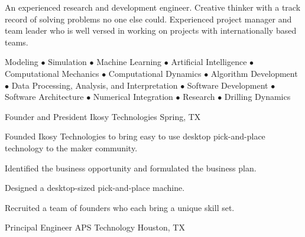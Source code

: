 \documentclass{leresume}
\begin{document}
		\thispagestyle{leempty}
		\makeresumeheaderC

		An experienced research and development engineer. Creative thinker with a track record of solving problems no one else could. Experienced project manager and team leader who is well versed in working on projects with internationally based teams.

	Modeling $\bullet$ Simulation $\bullet$ Machine Learning $\bullet$ Artificial Intelligence $\bullet$ Computational Mechanics $\bullet$ Computational Dynamics $\bullet$ Algorithm Development $\bullet$ Data Processing, Analysis, and Interpretation $\bullet$ Software Development $\bullet$ Software Architecture $\bullet$ Numerical Integration $\bullet$ Research $\bullet$ Drilling Dynamics

    
            {Founder and President}
            {Ikosy Technologies}
			{Spring, TX}
			
					\noindent Founded Ikosy Technologies to bring easy to use desktop pick-and-place technology to the maker community.
		\begin{bulletedlist}
			
		\item 
					Identified the business opportunity and formulated the business plan.
				
		\item 
					Designed a desktop-sized pick-and-place machine.
				
		\item 
					Recruited a team of founders who each bring a unique skill set.
				
		\end{bulletedlist}
	
            {Principal Engineer}
            {APS Technology}
			{Houston, TX}
			
\end{document}
